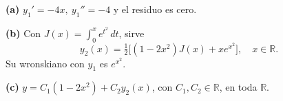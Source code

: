 \noindent\textbf{(a)} \(y_1'=-4x,\ y_1''=-4\) y el residuo es cero.

\noindent\textbf{(b)} Con \(J(x)=\int_0^x e^{t^2}\,dt\), sirve
\[y_2(x)=\tfrac12\big[(1-2x^2)J(x)+xe^{x^2}\big],\quad x\in\mathbb R.\]
Su wronskiano con \(y_1\) es \(e^{x^2}\).

\noindent\textbf{(c)} \(y=C_1(1-2x^2)+C_2y_2(x)\), con \(C_1,C_2\in\mathbb R\), en toda \(\mathbb R\).
